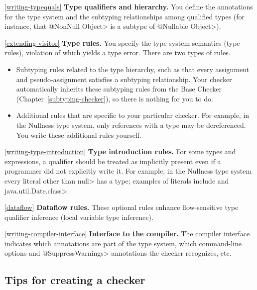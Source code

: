 \begin{description}

\item{\ref{writing-typequals}}
  \textbf{Type qualifiers and hierarchy.}  You define the annotations for
  the type system and the subtyping relationships among qualified types
  (for instance, that \<@NonNull Object> is a subtype of \<@Nullable
  Object>).

\item{\ref{extending-visitor}}
  \textbf{Type rules.}  You specify the type system semantics (type
  rules), violation of which yields a type error.  There are two types of
  rules.
\begin{itemize}
\item
  Subtyping rules related to the type hierarchy, such as that every
  assignment and pseudo-assignment satisfies a subtyping relationship.
  Your checker automatically inherits these subtyping rules from the Base
  Checker (Chapter~\ref{subtyping-checker}), so there is nothing for you to do.
\item
  Additional rules that are specific to your particular checker.  For
  example, in the Nullness type system, only references with a
   type may be dereferenced.  You
  write these additional rules yourself.
\end{itemize}

\item{\ref{writing-type-introduction}}
  \textbf{Type introduction rules.}  For some types and
  expressions, a qualifier should be treated as implicitly present even if a
  programmer did not explicitly write it.  For example, in the Nullness
  type system every literal
  other than \<null> has a  type;
  examples of literals include  and \<java.util.Date.class>.

\item{\ref{dataflow}}
  \textbf{Dataflow rules.}  These optional rules enhance flow-sensitive
  type qualifier inference (local variable type inference).

\item{\ref{writing-compiler-interface}}
  \textbf{Interface to the compiler.}  The compiler interface indicates
  which annotations are part of the type system, which command-line options
  and \<@SuppressWarnings> annotations the checker recognizes, etc.
\end{description}


\subsection{Tips for creating a checker\label{writing-tips}}

